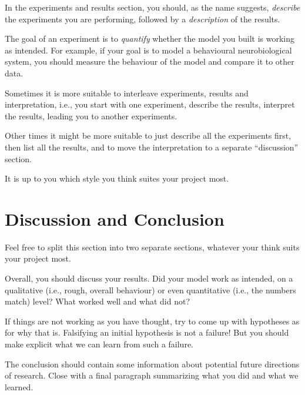 \documentclass[12pt,letterpaper,oneside]{article}
\begin{document}
	In the experiments and results section, you should, as the name suggests, \emph{describe} the experiments you are performing, followed by a \emph{description} of the results.

	The goal of an experiment is to \emph{quantify} whether the model you built is working as intended. For example, if your goal is to model a behavioural neurobiological system, you should measure the behaviour of the model and compare it to other data.

	Sometimes it is more suitable to interleave experiments, results and interpretation, i.e., you start with one experiment, describe the results, interpret the results, leading you to another experiments.

	Other times it might be more suitable to just describe all the experiments first, then list all the results, and to move the interpretation to a separate \enquote{discussion} section.

	It is up to you which style you think suites your project most.

	\section{Discussion and Conclusion}

	Feel free to split this section into two separate sections, whatever your think suits your project most.

	Overall, you should discuss your results. Did your model work as intended, on a qualitative (i.e., rough, overall behaviour) or even quantitative (i.e., the numbers match) level? What worked well and what did not?
	
	If things are not working as you have thought, try to come up with hypotheses as for why that is. Falsifying an initial hypothesis is not a failure! But you should make explicit what we can learn from such a failure.

	The conclusion should contain some information about potential future directions of research. Close with a final paragraph summarizing what you did and what we learned.

	\newpage
	\printbibliography
\end{document}
